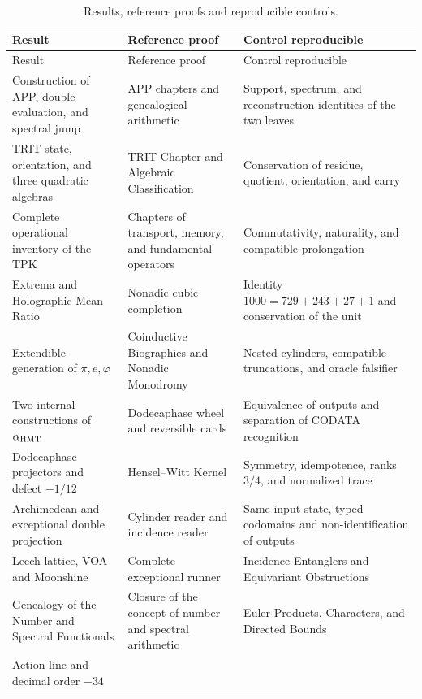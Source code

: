 \begingroup
\small
\setlength{\tabcolsep}{4pt}
\renewcommand{\arraystretch}{1.16}
\begin{longtable}{@{}>{\raggedright\arraybackslash}p{}
  >{\raggedright\arraybackslash}p{}
  >{\raggedright\arraybackslash}p{}@{}}
\caption{Results, reference proofs and reproducible controls.}
\label{tab:indice-fuentes-acumulativo}\\
\toprule
Result & Reference proof & Control reproducible\\
\midrule
\endfirsthead
\toprule
Result & Reference proof & Control reproducible\\
\midrule
\endhead
Construction of APP, double evaluation, and spectral jump
& APP chapters and genealogical arithmetic
& Support, spectrum, and reconstruction identities of the two leaves\\
TRIT state, orientation, and three quadratic algebras
& TRIT Chapter and Algebraic Classification
& Conservation of residue, quotient, orientation, and carry\\
Complete operational inventory of the TPK
& Chapters of transport, memory, and fundamental operators
& Commutativity, naturality, and compatible prolongation\\
Extrema and Holographic Mean Ratio
& Nonadic cubic completion
& Identity $1000=729+243+27+1$ and conservation of the unit\\
Extendible generation of \(\pi,e,\varphi\)
& Coinductive Biographies and Nonadic Monodromy
& Nested cylinders, compatible truncations, and oracle falsifier\\
Two internal constructions of \(\alpha_{\rm HMT}\)
& Dodecaphase wheel and reversible cards
& Equivalence of outputs and separation of CODATA recognition\\
Dodecaphase projectors and defect \(-1/12\)
& Hensel--Witt Kernel
& Symmetry, idempotence, ranks $3/4$, and normalized trace\\
Archimedean and exceptional double projection
& Cylinder reader and incidence reader
& Same input state, typed codomains and non-identification of outputs\\
Leech lattice, VOA and Moonshine
& Complete exceptional runner
& Incidence Entanglers and Equivariant Obstructions\\
Genealogy of the Number and Spectral Functionals
& Closure of the concept of number and spectral arithmetic
& Euler Products, Characters, and Directed Bounds\\
Action line and decimal order \(-34\)

\end{longtable}
